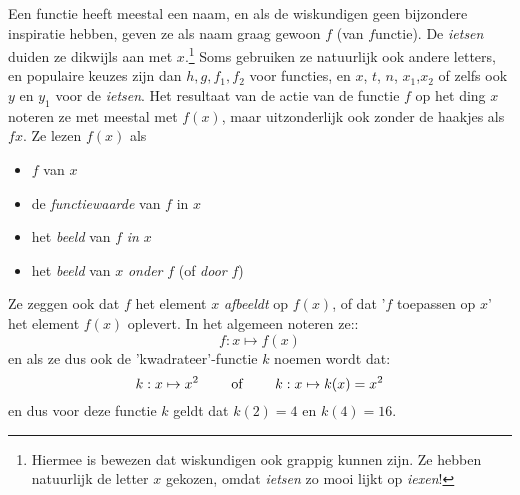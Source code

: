 \documentclass{ximera}
\begin{document}
\begin{center}
\end{center}


Een functie heeft meestal een naam, en als de wiskundigen geen bijzondere inspiratie hebben, geven ze als naam graag gewoon $f$ (van $f$unctie). De \textit{ietsen} duiden ze dikwijls aan met $x$.\footnote{Hiermee is bewezen dat wiskundigen ook grappig kunnen zijn. Ze hebben natuurlijk de letter $x$ gekozen, omdat \textit{ietsen} zo mooi lijkt op \textit{iexen}!} Soms gebruiken ze natuurlijk ook andere letters, en populaire keuzes zijn dan $h,g,f_1, f_2$ voor functies, en $x$, $t$, $n$, $x_1$,$x_2$ of zelfs ook $y$ en $y_1$  voor de \textit{ietsen}. Het resultaat van de actie van de functie $f$ op het ding $x$ noteren ze met meestal met $f(x)$, maar uitzonderlijk ook zonder de haakjes als $fx$. Ze lezen $f(x)$ als 
\begin{itemize}
\item $f$ van $x$
\item de \textit{functiewaarde} van $f$ in $x$
\item het \textit{beeld} van $f$ \textit{in} $x$
\item het \textit{beeld} van $x$ \textit{onder} $f$ (of \textit{door} $f$)
\end{itemize}
Ze zeggen ook dat $f$ het element $x$ \textit{afbeeldt} op $f(x)$, of dat '$f$ toepassen op $x$' het element $f(x)$ oplevert. In het algemeen noteren ze::
$$
f: x \mapsto f(x) 
$$
en als ze dus ook de 'kwadrateer'-functie $k$ noemen wordt dat:
$$
k: x \mapsto x^2 \text{ \qquad of \qquad }  k: x \mapsto k(x) = x^2
$$
en dus voor deze functie $k$ geldt dat $k(2)=4$ en $k(4)=16$.

\begin{center}
\end{center}
\end{document}
